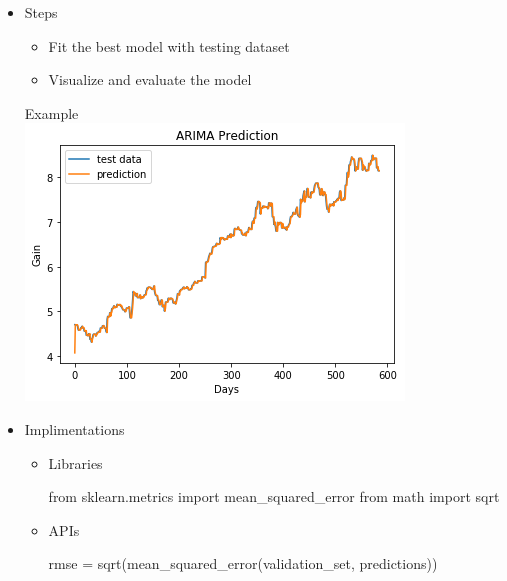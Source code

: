 \documentclass[11pt]{article}
\makeatletter
\def\maxwidth{\ifdim\Gin@nat@width>\linewidth\linewidth
    \else\Gin@nat@width\fi}
\let\Oldincludegraphics\includegraphics
\renewcommand{\includegraphics}[1]{\Oldincludegraphics[width=.8\maxwidth]{#1}}
\providecommand{\tightlist}{%
      \setlength{\itemsep}{0pt}\setlength{\parskip}{0pt}}
\newenvironment{Shaded}{}{}
\newcommand{\NormalTok}[1]{{#1}}
\newcommand{\ImportTok}[1]{{#1}}
\newcommand{\OperatorTok}[1]{\textcolor[rgb]{0.40,0.40,0.40}{{#1}}}
\makeatother
\begin{document}
\begin{enumerate}
  \begin{itemize}
  \tightlist
  \item
    Steps

    \begin{itemize}
    \tightlist
    \item
      Fit the best model with testing dataset
    \item
      Visualize and evaluate the model
    \end{itemize}

    Example \\
    \includegraphics{./figures/18.jpg}
  \item
    Implimentations

    \begin{itemize}
    \item
      Libraries

\begin{Shaded}
\begin{Highlighting}[]
\ImportTok{from}\NormalTok{ sklearn.metrics }\ImportTok{import}\NormalTok{ mean_squared_error}
\ImportTok{from}\NormalTok{ math }\ImportTok{import}\NormalTok{ sqrt}
\end{Highlighting}
\end{Shaded}
    \item
      APIs

\begin{Shaded}
\begin{Highlighting}[]
\NormalTok{rmse }\OperatorTok{=}\NormalTok{ sqrt(mean_squared_error(validation_set, predictions))}
\end{Highlighting}
\end{Shaded}
    \end{itemize}
  \end{itemize}
\end{enumerate}
\end{document}
